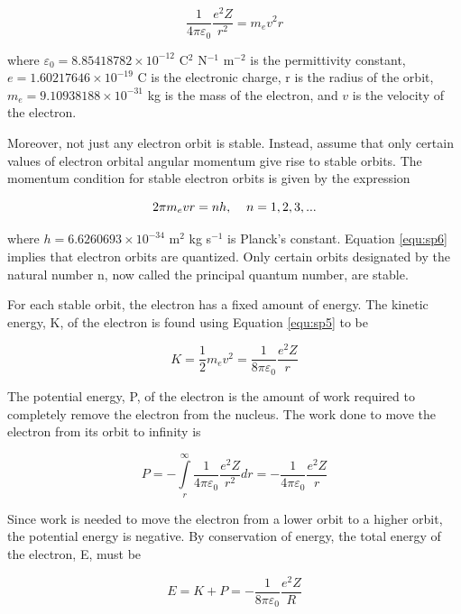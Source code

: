\begin{equation}
\dfrac{1}{4\pi\varepsilon_0}\dfrac{e^2Z}{r^2}={m_ev^2}{r}
\label{equ:sp5}
\end{equation}

\noindent where $\varepsilon_0 = 8.85418782\times10^{-12}$ C$^2$ N$^{-1}$ m$^{-2}$ is the permittivity constant, $e = 1.60217646\times10^{-19}$ C is the electronic charge, r is the radius of the orbit, $m_e = 9.10938188\times10^{-31}$ kg is the mass of the electron, and $v$ is the velocity of the electron.

Moreover, not just any electron orbit is stable. Instead, assume that only certain values of electron orbital angular momentum give rise to stable orbits. The momentum condition for stable electron orbits is given by the expression

\begin{equation}
2\pi m_evr=nh,\hspace{4mm}n=1,2,3,...
\label{equ:sp6}
\end{equation}

\noindent where $h = 6.6260693\times10^{-34}$ m$^2$ kg s$^{-1}$ is Planck's constant. Equation \ref{equ:sp6} implies that electron orbits are quantized. Only certain orbits designated by the natural number n, now called the principal quantum number, are stable.

For each stable orbit, the electron has a fixed amount of energy. The kinetic energy, K, of the electron is found using Equation \ref{equ:sp5} to be

\begin{equation}
K=\dfrac{1}{2}m_ev^2=\dfrac{1}{8\pi\varepsilon_0}\dfrac{e^2Z}{r}
\label{equ:sp7}
\end{equation}

\noindent The potential energy, P, of the electron is the amount of work required to completely remove the electron from the nucleus. The work done to move the electron from its orbit to infinity is

\begin{equation}
P=-\int\limits_r^\infty\dfrac{1}{4\pi\varepsilon_0}\dfrac{e^2Z}{r^2}dr=-\dfrac{1}{4\pi\varepsilon_0}\dfrac{e^2Z}{r}
\label{equ:sp8}
\end{equation}

\noindent Since work is needed to move the electron from a lower orbit to a higher orbit, the potential energy is negative. By conservation of energy, the total energy of the electron, E, must be

\begin{equation}
E=K+P=-\dfrac{1}{8\pi\varepsilon_0}\dfrac{e^2Z}{R}
\label{equ:sp9}
\end{equation}

